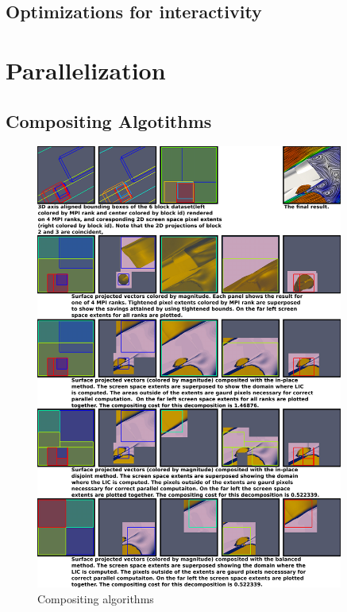 \documentclass[a4paper,10pt]{article}
\begin{document}
\subsection{Optimizations for interactivity}

\section{Parallelization}
\subsection{Compositing Algotithms}

\begin{figure}[h]
 \centering
 \includegraphics[width=0.9\textwidth]{./images-data/compositing-200ppi.png}
 \caption{Compositing algorithms}
 \label{fig:compositing}
\end{figure}
\end{document}
